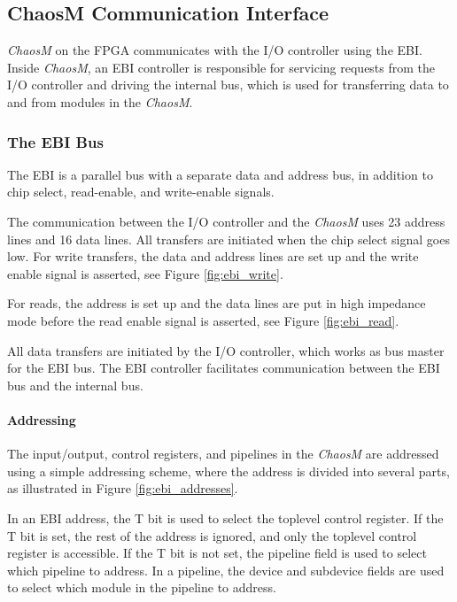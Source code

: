 
\FloatBarrier
\subsection{ChaosM Communication Interface}\label{section:fpga-buses}

\textit{ChaosM} on the FPGA communicates with the I/O controller using the EBI. Inside \textit{ChaosM}, an EBI controller is responsible
for servicing requests from the I/O controller and driving the internal bus, which
is used for transferring data to and from modules in the \textit{ChaosM}.

\subsubsection{The EBI Bus}
The EBI\cite{efm_ebi} is a parallel bus with a separate data and address bus, in
addition to chip select, read-enable, and write-enable signals.

The communication between the I/O controller and the \textit{ChaosM} uses 23 address lines and 16 data
lines. All transfers are initiated when the chip select signal goes low. For
write transfers, the data and address lines are set up and the write enable
signal is asserted, see Figure \ref{fig:ebi_write}.

For reads, the address is set up and the data lines are put in high impedance mode
before the read enable signal is asserted, see Figure \ref{fig:ebi_read}.




All data transfers are initiated by the I/O controller, which works as bus
master for the EBI bus. The EBI controller facilitates communication between
the EBI bus and the internal bus.

\FloatBarrier
\paragraph{Addressing}

The input/output, control registers, and pipelines in the \textit{ChaosM} are addressed
using a simple addressing scheme, where the address is divided into several
parts, as illustrated in Figure \ref{fig:ebi_addresses}.



In an EBI address, the T bit is used to select the toplevel control register.
If the T bit is set, the rest of the address is ignored, and only the toplevel
control register is accessible. If the T bit is not set, the pipeline field is
used to select which pipeline to address. In a pipeline, the device
and subdevice fields are used to select which module in the pipeline to address.

